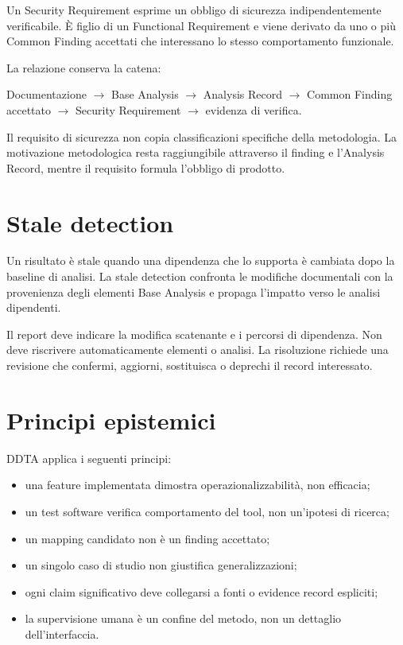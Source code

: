 \documentclass[12pt,a4paper,oneside]{report}
\begin{document}
Un Security Requirement esprime un obbligo di sicurezza indipendentemente verificabile. È figlio di un Functional Requirement e viene derivato da uno o più Common Finding accettati che interessano lo stesso comportamento funzionale.

La relazione conserva la catena:

\begin{center}
Documentazione $\rightarrow$ Base Analysis $\rightarrow$ Analysis Record $\rightarrow$ Common Finding accettato $\rightarrow$ Security Requirement $\rightarrow$ evidenza di verifica.
\end{center}

Il requisito di sicurezza non copia classificazioni specifiche della metodologia. La motivazione metodologica resta raggiungibile attraverso il finding e l'Analysis Record, mentre il requisito formula l'obbligo di prodotto.

\section{Stale detection}

Un risultato è stale quando una dipendenza che lo supporta è cambiata dopo la baseline di analisi. La stale detection confronta le modifiche documentali con la provenienza degli elementi Base Analysis e propaga l'impatto verso le analisi dipendenti.

Il report deve indicare la modifica scatenante e i percorsi di dipendenza. Non deve riscrivere automaticamente elementi o analisi. La risoluzione richiede una revisione che confermi, aggiorni, sostituisca o deprechi il record interessato.

\section{Principi epistemici}

DDTA applica i seguenti principi:

\begin{itemize}
  \item una feature implementata dimostra operazionalizzabilità, non efficacia;
  \item un test software verifica comportamento del tool, non un'ipotesi di ricerca;
  \item un mapping candidato non è un finding accettato;
  \item un singolo caso di studio non giustifica generalizzazioni;
  \item ogni claim significativo deve collegarsi a fonti o evidence record espliciti;
  \item la supervisione umana è un confine del metodo, non un dettaglio dell'interfaccia.
\end{itemize}
\end{document}
